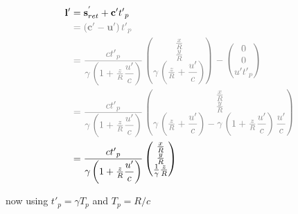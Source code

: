\begin{equation}
	\begin{split}
		\mathbf{l}{'}
		 & = \mathbf{s}_{ret}^{'} + \mathbf{c}{'}t{'}_{p}
		\\
		 & \color{gray} = \left( \mathbf{c}{'}-\mathbf{u'} \right)t{'}_{p}
		\\
		 & \color{gray} = \dfrac{{c}t{'}_{p}}{{\gamma}\left(1 + \frac{z}{R} \dfrac{u'}{c} \right)}
		\begin{pmatrix}
			\frac{x}{R}                                        \\
			\frac{y}{R}                                        \\
			{\gamma} \left( \frac{z}{R} + \dfrac{u'}{c} \right) \\
		\end{pmatrix}
		-
		\begin{pmatrix}
			0            \\
			0            \\
			u' {t{'}_{p}} \\
		\end{pmatrix}
		\\
		 & \color{gray} = \dfrac{{c}t{'}_{p}}{{\gamma}\left(1 + \frac{z}{R} \dfrac{u'}{c} \right)}
		\begin{pmatrix}
			\frac{x}{R}                                                                                                                     \\
			\frac{y}{R}                                                                                                                     \\
			{\gamma} \left( \frac{z}{R} + \dfrac{u'}{c} \right)-{\gamma}\left(1 + \frac{z}{R} \dfrac{u'}{c} \right) \dfrac{u'}{c} \\
		\end{pmatrix}
		\\
		 & = \dfrac{{c}t{'}_{p}}{{\gamma}\left(1 + \frac{z}{R} \dfrac{u'}{c} \right)}
		\begin{pmatrix}
			\frac{x}{R}                    \\
			\frac{y}{R}                    \\
			\frac{1}{{\gamma}} \frac{z}{R} \\
		\end{pmatrix}
	\end{split}
\end{equation}

now using $ t{'}_{p} = {\gamma} {T}_{p}$ and ${T}_{p}= R / c$

